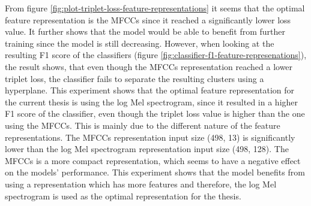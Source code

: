 \newline
\newline
From figure \ref{fig:plot-triplet-loss-feature-representations} it seems that the optimal feature representation is the MFCCs since it reached a significantly lower loss value. It further shows that the model would be able to benefit from further training since the model is still decreasing. However, when looking at the resulting F1 score of the classifiers (figure \ref{fig:classifier-f1-feature-represenations}), the result shows, that even though the MFCCs representation reached a lower triplet loss, the classifier fails to separate the resulting clusters using a hyperplane. 
\newline
\newline
This experiment shows that the optimal feature representation for the current thesis is using the log Mel spectrogram, since it resulted in a higher F1 score of the classifier, even though the triplet loss value is higher than the one using the MFCCs. 
\newline
\newline
This is mainly due to the different nature of the feature representations. The MFCCs representation input size (498, 13) is significantly lower than the log Mel spectrogram representation input size (498, 128). The MFCCs is a more compact representation, which seems to have a negative effect on the models' performance.
\newline
\newline
This experiment shows that the model benefits from using a representation which has more features and therefore, the log Mel spectrogram is used as the optimal representation for the thesis.

